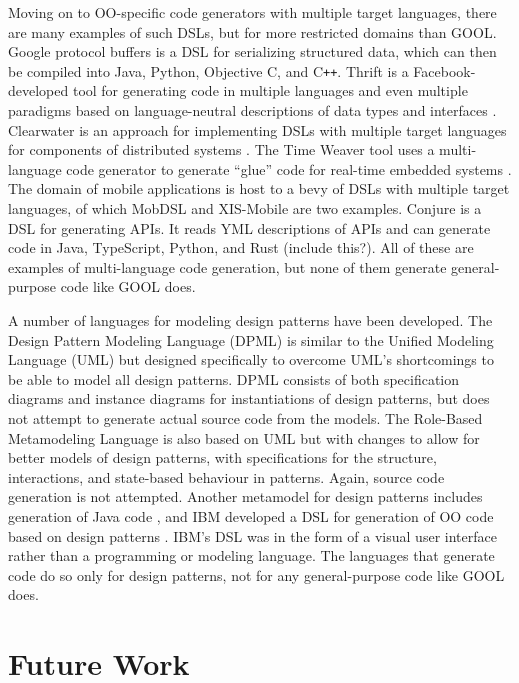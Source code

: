 \documentclass[sigplan,review,anonymous,prologue,dvipsnames]{acmart}
\newcommand{\Cplusplus}{C\texttt{++}}
\begin{document}
Moving on to OO-specific code generators with multiple target languages, there
are many examples of such DSLs, but for more restricted domains than GOOL.
Google protocol buffers is a DSL for serializing structured data, which can
then be compiled into Java, Python, Objective C, and \Cplusplus \cite{Protobuf}.
Thrift is a Facebook-developed tool for generating code in multiple languages
and even multiple paradigms based on language-neutral descriptions of data
types and interfaces \cite{slee2007thrift}. Clearwater is an approach for
implementing DSLs with multiple target languages for components of distributed
systems \cite{swint2005clearwater}. The Time Weaver tool uses a multi-language
code generator to generate ``glue'' code for real-time embedded systems
\cite{de2004glue}. The domain of mobile applications is host to a bevy of DSLs
with multiple target languages, of which MobDSL \cite{kramer2010mobdsl} and
XIS-Mobile \cite{ribeiro2014xis} are two examples. Conjure is a DSL for
generating APIs. It reads YML descriptions of APIs and can generate code in
Java, TypeScript, Python, and Rust \cite{Conjure} (include this?). All of these
are examples of multi-language code generation, but none of them generate
general-purpose code like GOOL does.

A number of languages for modeling design patterns have been developed. The
Design Pattern Modeling Language (DPML) \cite{mapelsden2002design} is similar
to the Unified Modeling Language (UML) but designed specifically to overcome
UML's shortcomings to be able to model all design patterns. DPML consists of
both specification diagrams and instance diagrams for instantiations of design
patterns, but does not attempt to generate actual source code from the models.
The Role-Based Metamodeling Language \cite{kim2003uml} is also based on UML but
with changes to allow for better models of design patterns, with specifications
for the structure, interactions, and state-based behaviour in patterns. Again,
source code generation is not attempted. Another metamodel for design patterns
includes generation of Java code \cite{albin2001meta}, and IBM developed a DSL
for generation of OO code based on design patterns
\cite{budinsky1996automatic}. IBM's DSL was in the form of a visual user
interface rather than a programming or modeling language. The languages that
generate code do so only for design patterns, not for any general-purpose code
like GOOL does.

\section{Future Work} \label{sec:future}
\end{document}
